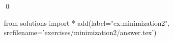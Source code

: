
\begin{ex} 
  \label{ex:minimization2}
  
  \qed
\end{ex} 
\begin{python0}
from solutions import *
add(label="ex:minimization2",
    srcfilename='exercises/minimization2/answer.tex') 
\end{python0}
